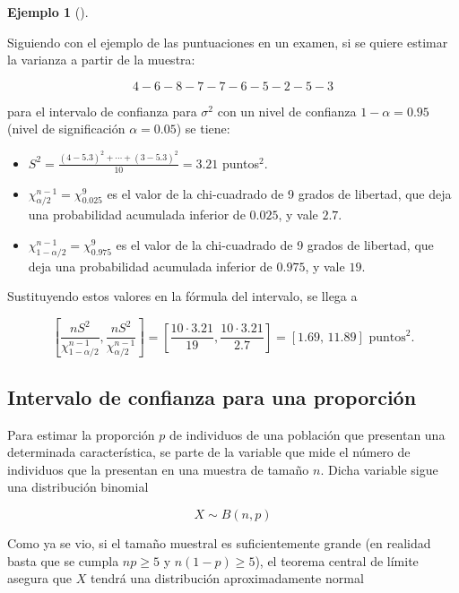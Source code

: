 \documentclass[
  a4paper,
]{scrreport}
\providecommand{\tightlist}{%
  \setlength{\itemsep}{0pt}\setlength{\parskip}{0pt}}\usepackage{longtable,booktabs,array}
\theoremstyle{plain}
\theoremstyle{definition}
\theoremstyle{definition}
\newtheorem{example}{Ejemplo}[chapter]
\theoremstyle{remark}
\begin{document}
\begin{example}[]\protect\hypertarget{exm-intervalo-confianza-varianza-normal}{}\label{exm-intervalo-confianza-varianza-normal}

Siguiendo con el ejemplo de las puntuaciones en un examen, si se quiere
estimar la varianza a partir de la muestra:

\[
4 - 6 - 8 - 7 - 7 - 6 - 5 - 2 - 5 - 3
\]

para el intervalo de confianza para \(\sigma^2\) con un nivel de
confianza \(1-\alpha=0.95\) (nivel de significación \(\alpha=0.05\)) se
tiene:

\begin{itemize}
\tightlist
\item
  \(S^2= \frac{(4-5.3)^2+\cdots+(3-5.3)^2}{10} = 3.21\) puntos\(^2\).
\item
  \(\chi^{n-1}_{\alpha/2}=\chi^9_{0.025}\) es el valor de la
  chi-cuadrado de 9 grados de libertad, que deja una probabilidad
  acumulada inferior de \(0.025\), y vale \(2.7\).
\item
  \(\chi^{n-1}_{1-\alpha/2}=\chi^9_{0.975}\) es el valor de la
  chi-cuadrado de 9 grados de libertad, que deja una probabilidad
  acumulada inferior de \(0.975\), y vale \(19\).
\end{itemize}

Sustituyendo estos valores en la fórmula del intervalo, se llega a

\[
\left[\frac{nS^2}{\chi^{n-1}_{1-\alpha/2}},\frac{nS^2}{\chi^{n-1}_{\alpha/2}}\right] =
\left[\frac{10\cdot 3.21}{19},\frac{10\cdot 3.21}{2.7}\right] = [1.69,\,11.89] \text{ puntos}^2.
\]

\end{example}

\subsection{Intervalo de confianza para una
proporción}\label{intervalo-de-confianza-para-una-proporciuxf3n}

Para estimar la proporción \(p\) de individuos de una población que
presentan una determinada característica, se parte de la variable que
mide el número de individuos que la presentan en una muestra de tamaño
\(n\). Dicha variable sigue una distribución binomial

\[
X\sim B(n,p)
\]

Como ya se vio, si el tamaño muestral es suficientemente grande (en
realidad basta que se cumpla \(np\geq 5\) y \(n(1-p)\geq 5\)), el
teorema central de límite asegura que \(X\) tendrá una distribución
aproximadamente normal
\end{document}
